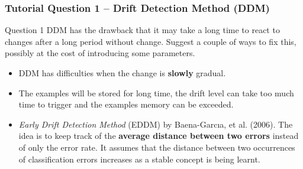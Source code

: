 \documentclass[aspectratio=169, 10pt]{beamer}
\begin{document}
\begin{frame}[t]
    \frametitle{Tutorial Question 1 -- Drift Detection Method (DDM)}

    \begin{block}{Question 1}
        DDM has the drawback that it may take a long time to react to changes after a long period without change.
        Suggest a couple of ways to fix this, possibly at the cost of introducing some parameters.
    \end{block}
    
    \begin{itemize}
        \item DDM has difficulties when the change is \textbf{slowly} gradual. 
        \item  The examples will be stored for long time, the drift level can take too much time to trigger and the examples memory can be exceeded.
        \item {\em Early Drift Detection Method} (EDDM) by Baena-Garcıa, et al. (2006). The idea is to keep track of the \textbf{average distance between two errors} instead of only the error rate.
        It assumes that the distance between two occurrences of classification errors increases as a stable concept is being learnt.
    \end{itemize}
\end{frame}

    
    

    
\end{document}

